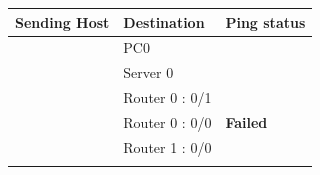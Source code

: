 \documentclass[a4paper,11pt]{article}
\begin{document}
\begin{enumerate}
          \begin{table}[H]
              \centering
              \begin{tabular}{| m{9em}| m{12em}| m{9em} |}
                  \hline
                  {\cellcolor[rgb]{0.333,0.686,1}}\textbf{Sending Host}           & \textbf{Destination} & \multicolumn{1}{l|}{\textbf{Ping status}}                                             \\
                  \hline
                  {\cellcolor[rgb]{0.333,0.686,1}}                                & PC0                  & \multicolumn{1}{l|}{{\cellcolor[rgb]{1,0.173,0.09}}}                                  \\
                  \hhline{|>{\arrayrulecolor[rgb]{0.333,0.686,1}}->{\arrayrulecolor{black}}->{\arrayrulecolor[rgb]{1,0.173,0.09}}->{\arrayrulecolor{black}}|}
                  {\cellcolor[rgb]{0.333,0.686,1}}                                & Server 0             & \multicolumn{1}{l|}{{\cellcolor[rgb]{1,0.173,0.09}}}                                  \\
                  \hhline{|>{\arrayrulecolor[rgb]{0.333,0.686,1}}->{\arrayrulecolor{black}}->{\arrayrulecolor[rgb]{1,0.173,0.09}}->{\arrayrulecolor{black}}|}
                  {\cellcolor[rgb]{0.333,0.686,1}}                                & Router 0 : 0/1       & \multicolumn{1}{l|}{{\cellcolor[rgb]{1,0.173,0.09}}}                                  \\
                  \hhline{|>{\arrayrulecolor[rgb]{0.333,0.686,1}}->{\arrayrulecolor{black}}->{\arrayrulecolor[rgb]{1,0.173,0.09}}->{\arrayrulecolor{black}}|}
                  {\cellcolor[rgb]{0.333,0.686,1}}                                & Router 0 : 0/0       & \multicolumn{1}{l|}{\multirow{-4}{*}{{\cellcolor[rgb]{1,0.173,0.09}}\textbf{Failed}}} \\
                  \hhline{|>{\arrayrulecolor[rgb]{0.333,0.686,1}}->{\arrayrulecolor{black}}--}
                  {\cellcolor[rgb]{0.333,0.686,1}}                                & Router 1 : 0/0       & {\cellcolor[rgb]{0.376,1,0.882}}                                                      \\
                  \hhline{|>{\arrayrulecolor[rgb]{0.333,0.686,1}}->{\arrayrulecolor{black}}->{\arrayrulecolor[rgb]{0.376,1,0.882}}-}

\end{tabular}
\end{table}
\end{enumerate}
\end{document}
